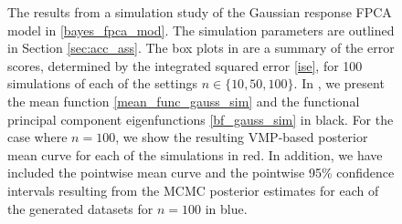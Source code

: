 \documentclass[12pt]{article}
\theoremstyle{plain}
\theoremstyle{definition}
\theoremstyle{remark}
\begin{document}
\begin{figure}[t!]
\centering
\tabskip=0pt
\caption{
	The results from a simulation study of the Gaussian response FPCA model in \eqref{bayes_fpca_mod}. The
	simulation parameters are outlined in Section \ref{sec:acc_ass}.
	The box plots in  are a summary of the error scores, determined by the integrated
	squared error \eqref{ise}, for 100 simulations of each of the settings $n \in \{ 10, 50, 100 \}$.
	In , we present the mean function \eqref{mean_func_gauss_sim} and the functional
	principal component eigenfunctions \eqref{bf_gauss_sim} in black. For the case where $n = 100$, we show
	the resulting VMP-based posterior mean curve for each of the simulations in red. In addition, we have
	included the pointwise mean curve and the pointwise 95\% confidence intervals resulting from the MCMC
	posterior estimates for each of the generated datasets
	for $n = 100$ in blue.
}
\label{fig:gauss_resp_sim_st}
\end{figure}
\end{document}

